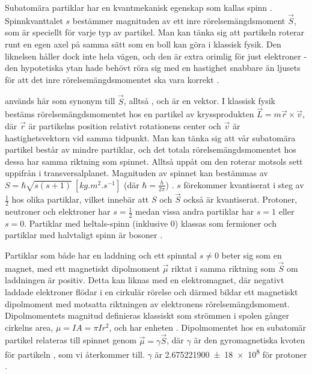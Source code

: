 \documentclass[11pt, a4paper]{article}
\begin{document}
Subatomära partiklar har en kvantmekanisk egenskap som kallas spinn \parencite{college_physics}. Spinnkvanttalet $s$ bestämmer magnituden av ett inre rörelsemängdsmoment $\vec{S}$, som är speciellt för varje typ av partikel. Man kan tänka sig att partikeln roterar runt en egen axel på samma sätt som en boll kan göra i klassisk fysik. Den liknelsen håller dock inte hela vägen, och den är extra orimlig för just elektroner - den hypotetiska ytan hade behövt röra sig med en hastighet snabbare än ljusets för att det inre rörelsemängdsmomentet ska vara korrekt \parencite{electron_spin}. 

 används här som synonym till $\vec{S}$, alltså , och är en vektor. I klassisk fysik bestäms rörelse\-mängdsmomentet hos en partikel av kryssprodukten $\vec{L}=m\vec{r}\times\vec{v}$, där $\vec{r}$ är partikelns position relativt rotationens center och $\vec{v}$ är hastighetsvektorn vid samma tidpunkt. Man kan tänka sig att vår subatomära partikel består av mindre partiklar, och det totala rörelsemängdsmomentet hos dessa har samma riktning som spinnet. Alltså uppåt om den roterar motsols sett uppifrån i transversalplanet. Magnituden av spinnet kan bestämmas av $S=\hbar\sqrt{s(s+1)}\:\left[\si{kg.m^2.s^{-1}}\right]$ (där $\hbar=\frac{h}{2\pi}$) \parencite{college_physics}. $s$ förekommer kvantiserat i steg av $\frac{1}{2}$ hos olika partiklar, vilket innebär att $S$ och $\vec{S}$ också är kvantiserat. Protoner, neutroner och elektroner har $s=\frac{1}{2}$ medan vissa andra partiklar har $s=1$ eller $s=0$. Partiklar med heltals-spinn (inklusive 0) klassas som fermioner och partiklar med halvtaligt spinn är bosoner \parencite{subatomic_particles}.

Partiklar som både har en laddning och ett spinntal $s\neq 0$ beter sig som en magnet, med ett magnetiskt dipolmoment $\vec{\mu}$ riktat i samma riktning som $\vec{S}$ om laddningen är positiv. Detta kan liknas med en elektromagnet, där negativt laddade elektroner flödar i en cirkulär rörelse och därmed bildar ett magnetiskt dipolmoment med motsatta riktningen av elektronens rörelsemängdsmoment. Dipolmomentets magnitud definieras klassiskt som strömmen i spolen gånger cirkelns area, $\mu=IA=\pi Ir^2$, och har enheten \si{\left[A.m^2\right]} \parencite{magnetism}. Dipolmomentet hos en subatomär partikel relateras till spinnet genom $\vec{\mu}=\gamma\vec{S}$, där $\gamma$ är den gyromagnetiska kvoten för partikeln \parencite{larmor_precession}, som vi återkommer till. $\gamma$ är \SI{2.675 221 900(18) e8}{\left[s^{-1}.T^{-1}\right]} för protoner \parencite{gyro_ratio}. 
\end{document}
